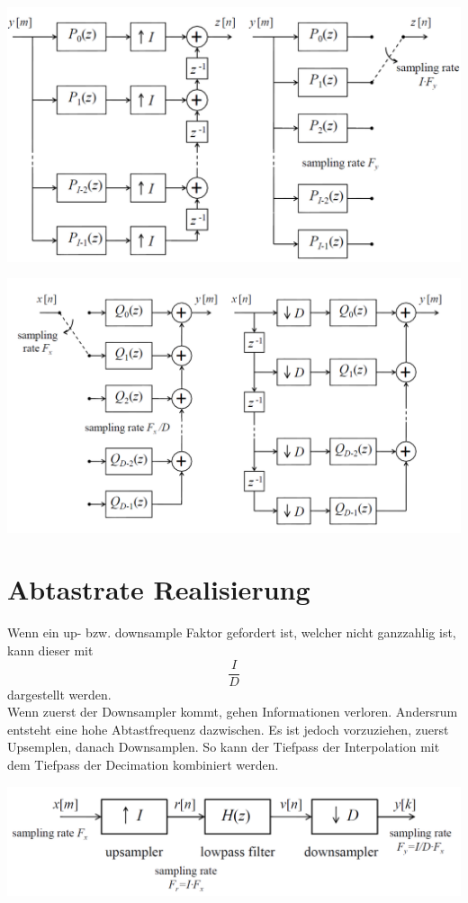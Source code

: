 \begin{minipage}{.48\textwidth}
	\centering
	\includegraphics[width=\textwidth]{../fig/polyphase_up}
\end{minipage}
\begin{minipage}{.48\textwidth}
	\centering
	\includegraphics[width=\textwidth]{../fig/polyphase_down}
\end{minipage}

\section{Abtastrate Realisierung}
Wenn ein up- bzw. downsample Faktor gefordert ist, welcher nicht ganzzahlig ist,
kann dieser mit
\[ \frac{I}{D} \]
dargestellt werden.\\
Wenn zuerst der Downsampler kommt, gehen Informationen verloren. Andersrum
entsteht eine hohe Abtastfrequenz dazwischen. Es ist jedoch vorzuziehen,
zuerst Upsemplen, danach Downsamplen. So kann der Tiefpass der Interpolation
mit dem Tiefpass der Decimation kombiniert werden.
\begin{center}
	\includegraphics[scale=.7]{../fig/sampling}
\end{center}

